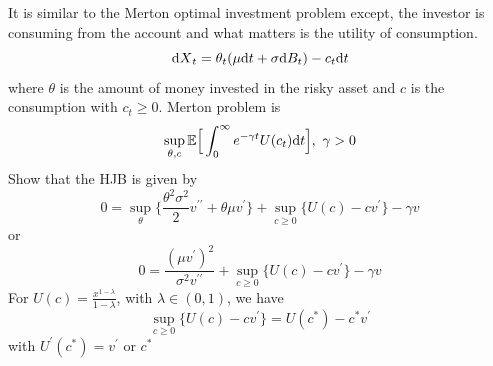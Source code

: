 \documentclass[11pt]{book}
\newcommand{\dd}{\text{\normalfont d}}
\newcommand{\dt}{\text{\normalfont d}t}
\newcommand{\dX}{\text{\normalfont d}X}
\begin{document}
\begin{ex}
    {}
    It is similar to the Merton optimal investment problem except, the investor is consuming from the account and what matters is the utility of consumption.
    \begin{equation}
        {\dX}_t=\theta_t(\mu {{\dt}}+ \sigma {\dd}B_t)-c_t{{\dt}}
    \end{equation}
    where $\theta$ is the amount of money invested in the risky asset and $c$ is the consumption with $c_t\ge0$.
    Merton problem is 
    \begin{equation}
        \sup_{\theta,c}\mathbb{E}\Big[\int_0^\infty e^{-\gamma t}U(c_t){\dt}\Big], ~\gamma>0
    \end{equation}
    Show that the HJB is given by
    \begin{equation}
        0= \sup_{\theta}\bigg\{\frac{\theta^2\sigma^2}{2}v^{\prime\prime}+\theta\mu v^\prime\bigg\}+\sup_{c\ge0}\Big\{U(c)-cv^\prime\Big\}-\gamma v
    \end{equation}
    or 
    \begin{equation}\label{eqn:HJB_consumption}
        0=\frac{(\mu v^\prime)^2}{\sigma^2 v^{\prime\prime}}+\sup_{c\ge0}\Big\{U(c)-cv^\prime\Big\}-\gamma v
    \end{equation}
For $U(c)=\frac{x^{1-\lambda}}{1-\lambda}$, with $\lambda\in(0,1)$, we have
\begin{equation}
    \sup_{c\ge0}\Big\{U(c)-cv^\prime\Big\}=U(c^*)-c^*v^\prime
\end{equation}
with $U^\prime(c^*)=v^\prime$ or $c^*$
\end{ex}

\end{document}
